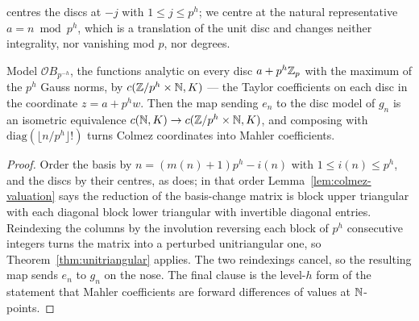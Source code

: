 \cite{Colmez} centres the discs at $-j$ with $1\leq j\leq p^{h}$; we centre at the natural
representative $a = n\bmod p^{h}$, which is a translation of the unit disc and changes neither
integrality, nor vanishing mod $p$, nor degrees.

\begin{theorem}
  \label{thm:amice}
  \leanok
  Model $\mathcal{O}B_{p^{-h}}$, the functions analytic on every disc $a+p^{h}\mathbb{Z}_p$ with the
  maximum of the $p^{h}$ Gauss norms, by $c(\mathbb{Z}/p^{h}\times\mathbb{N}, K)$ --- the Taylor coefficients on
  each disc in the coordinate $z = a+p^{h}w$.  Then the map sending $e_n$ to the disc model of
  $g_n$ is an isometric equivalence $c(\mathbb{N},K) \to c(\mathbb{Z}/p^{h}\times\mathbb{N},K)$, and composing with
  $\mathrm{diag}(\lfloor n/p^{h}\rfloor!)$ turns Colmez coordinates into Mahler coefficients.
\end{theorem}

\begin{proof}
  \leanok
  Order the basis by $n = (m(n)+1)p^{h} - i(n)$ with $1\leq i(n)\leq p^{h}$, and the discs by
  their centres, as \cite{Colmez} does; in that order Lemma~\ref{lem:colmez-valuation} says the
  reduction of the basis-change matrix is block upper triangular with each diagonal block lower
  triangular with invertible diagonal entries.  Reindexing the columns by the involution
  reversing each block of $p^{h}$ consecutive integers turns the matrix into a perturbed
  unitriangular one, so Theorem~\ref{thm:unitriangular} applies.  The two reindexings cancel, so
  the resulting map sends $e_n$ to $g_n$ on the nose.  The final clause is the level-$h$ form of
  the statement that Mahler coefficients are forward differences of values at $\mathbb{N}$-points.
\end{proof}

